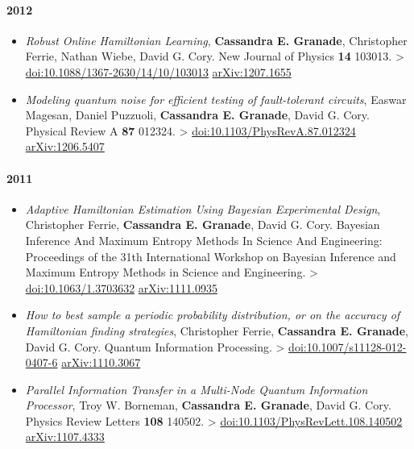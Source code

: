 \documentclass[]{article}
\begin{document}
\paragraph{2012}\label{section-2}

\begin{itemize}
\item
  \emph{Robust Online Hamiltonian Learning}, \textbf{Cassandra E.
  Granade}, Christopher Ferrie, Nathan Wiebe, David G. Cory. New Journal
  of Physics \textbf{14} 103013. \textgreater{}
  \href{http://dx.doi.org/10.1088/1367-2630/14/10/103013}{doi:10.1088/1367-2630/14/10/103013}
  \textbar{} \href{http://arxiv.org/abs/1207.1655}{arXiv:1207.1655}
\item
  \emph{Modeling quantum noise for efficient testing of fault-tolerant
  circuits}, Easwar Magesan, Daniel Puzzuoli, \textbf{Cassandra E.
  Granade}, David G. Cory. Physical Review A \textbf{87} 012324.
  \textgreater{}
  \href{http://dx.doi.org/10.1103/PhysRevA.87.012324}{doi:10.1103/PhysRevA.87.012324}
  \textbar{} \href{http://arxiv.org/abs/1206.5407}{arXiv:1206.5407}
\end{itemize}

\paragraph{2011}\label{section-3}

\begin{itemize}
\item
  \emph{Adaptive Hamiltonian Estimation Using Bayesian Experimental
  Design}, Christopher Ferrie, \textbf{Cassandra E. Granade}, David G.
  Cory. Bayesian Inference And Maximum Entropy Methods In Science And
  Engineering: Proceedings of the 31th International Workshop on
  Bayesian Inference and Maximum Entropy Methods in Science and
  Engineering. \textgreater{}
  \href{http://dx.doi.org/10.1063/1.3703632}{doi:10.1063/1.3703632}
  \textbar{} \href{http://arxiv.org/abs/1111.0935}{arXiv:1111.0935}
\item
  \emph{How to best sample a periodic probability distribution, or on
  the accuracy of Hamiltonian finding strategies}, Christopher Ferrie,
  \textbf{Cassandra E. Granade}, David G. Cory. Quantum Information
  Processing. \textgreater{}
  \href{http://dx.doi.org/10.1007/s11128-012-0407-6}{doi:10.1007/s11128-012-0407-6}
  \textbar{} \href{http://arxiv.org/abs/1110.3067}{arXiv:1110.3067}
\item
  \emph{Parallel Information Transfer in a Multi-Node Quantum
  Information Processor}, Troy W. Borneman, \textbf{Cassandra E.
  Granade}, David G. Cory. Physics Review Letters \textbf{108} 140502.
  \textgreater{}
  \href{http://dx.doi.org/10.1103/PhysRevLett.108.140502}{doi:10.1103/PhysRevLett.108.140502}
  \textbar{} \href{http://arxiv.org/abs/1107.4333}{arXiv:1107.4333}
\end{itemize}
\end{document}
